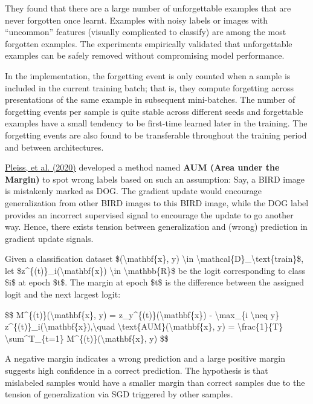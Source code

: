 They found that there are a large number of unforgettable examples that are never forgotten once learnt. Examples with noisy labels or images with ``uncommon'' features (visually complicated to classify) are among the most forgotten examples. The experiments empirically validated that unforgettable examples can be safely removed without compromising model performance.

In the implementation, the forgetting event is only counted when a sample is included in the current training batch; that is, they compute forgetting across presentations of the same example in subsequent mini-batches. The number of forgetting events per sample is quite stable across different seeds and forgettable examples have a small tendency to be first-time learned later in the training. The forgetting events are also found to be transferable throughout the training period and between architectures.

\href{https://arxiv.org/abs/2001.10528}{Pleiss, et al. (2020)} developed a method named \textbf{AUM (Area under the Margin)} to spot wrong labels based on such an assumption: Say, a BIRD image is mistakenly marked as DOG. The gradient update would encourage generalization from other BIRD images to this BIRD image, while the DOG label provides an incorrect supervised signal to encourage the update to go another way. Hence, there exists tension between generalization and (wrong) prediction in gradient update signals.

Given a classification dataset \$(\textbackslash mathbf\{x\}, y) \textbackslash in \textbackslash mathcal\{D\}\_\textbackslash text\{train\}\$, let \$z\^{}\{(t)\}\_i(\textbackslash mathbf\{x\}) \textbackslash in \textbackslash mathbb\{R\}\$ be the logit corresponding to class \$i\$ at epoch \$t\$. The margin at epoch \$t\$ is the difference between the assigned logit and the next largest logit:

\$\$ M\^{}\{(t)\}(\textbackslash mathbf\{x\}, y) = z\_y\^{}\{(t)\}(\textbackslash mathbf\{x\}) - \textbackslash max\_\{i \textbackslash neq y\} z\^{}\{(t)\}\_i(\textbackslash mathbf\{x\}),\textbackslash quad \textbackslash text\{AUM\}(\textbackslash mathbf\{x\}, y) = \textbackslash frac\{1\}\{T\} \textbackslash sum\^{}T\_\{t=1\} M\^{}\{(t)\}(\textbackslash mathbf\{x\}, y) \$\$

A negative margin indicates a wrong prediction and a large positive margin suggests high confidence in a correct prediction. The hypothesis is that mislabeled samples would have a smaller margin than correct samples due to the tension of generalization via SGD triggered by other samples.

